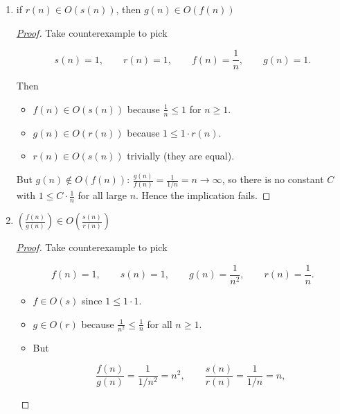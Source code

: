 \documentclass[11pt]{article}
\begin{document}
\begin{enumerate}
\begin{enumerate}
\begin{proof}[\underline{Proof}]
\[
\Rightarrow f(n) + g(n) \le f(n) + C_2 f(n) = (1 + C_2) f(n) \le (1 + C_2) C_1 s(n)
\]

\underline{Conclustion.} Thus, \(f(n) + g(n) \in O(s(n))\) which the constant is \((1 + C_2) C_1\) and \(n_0 = \max(n_1, n_2)\).

\end{proof}

\item if \(r(n) \in O(s(n))\), then \(g(n) \in O(f(n))\)

\begin{proof}[\underline{Proof}]

Take counterexample to pick

\[
s(n)=1,\qquad r(n)=1,\qquad f(n)=\frac{1}{n},\qquad g(n)=1.
\]

Then

\begin{itemize}
\item $f(n)\in O(s(n))$ because $\frac{1}{n}\le 1$ for $n\ge1$.
\item  $g(n)\in O(r(n))$ because $1\le 1\cdot r(n)$.
\item  $r(n)\in O(s(n))$ trivially (they are equal).
\end{itemize}

But $g(n)\notin O(f(n))$: $\frac{g(n)}{f(n)}=\frac{1}{1/n}=n\to\infty$, so there is no constant $C$ with $1\le C\cdot\frac{1}{n}$ for all large $n$. Hence the implication fails.

\end{proof}

\item \((\frac{f(n)}{g(n)}) \in O(\frac{s(n)}{r(n)})\)

\begin{proof}[\underline{Proof}]

Take counterexample to pick

$$
f(n)=1,\qquad s(n)=1,\qquad g(n)=\frac{1}{n^2},\qquad r(n)=\frac{1}{n}.
$$


\begin{itemize}
\item $f\in O(s)$ since $1\le 1\cdot 1$.
\item $g\in O(r)$ because $\tfrac{1}{n^2}\le \tfrac{1}{n}$ for all $n\ge1$.
\item But

\[
\frac{f(n)}{g(n)}=\frac{1}{1/n^2}=n^2,\qquad
\frac{s(n)}{r(n)}=\frac{1}{1/n}=n,
\]

\end{itemize}


\end{proof}
\end{enumerate}
\end{enumerate}
\end{document}
